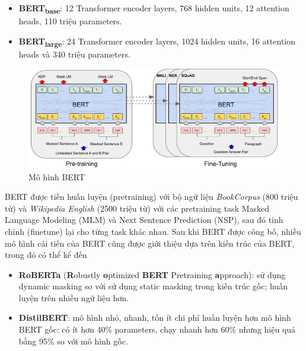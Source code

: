 \begin{itemize}
\item \textbf{BERT\textsubscript{base}}: 12 Transformer encoder layers, 768 hidden units, 12 attention heads, 110 triệu parameters.
\item \textbf{BERT\textsubscript{large}}: 24 Transformer encoder layers, 1024 hidden units, 16 attention heads và 340 triệu parameters.
\end{itemize}
\begin{figure}[H]
\centering
\includegraphics[scale=.65]{img/BERT.jpg}
\caption{Mô hình BERT\cite{devlin-etal-2019-bert}}
\label{fig:my_label}
\end{figure}
BERT được tiền huấn luyện (pretraining) với bộ ngữ liệu \textit{BookCorpus} (800 triệu từ) và \textit{Wikipedia English} (2500 triệu từ) với các pretraining task Masked Language Modeling (MLM) và Next Sentence Prediction (NSP), sau đó tinh chỉnh (finetune) lại cho từng task khác nhau. Sau khi BERT được công bố, nhiều mô hình cải tiến của BERT cũng được giới thiệu dựa trên kiến trúc của BERT, trong đó có thể kể đến
\begin{itemize}
\item \textbf{RoBERTa} (\textbf{R}obustly \textbf{o}ptimized \textbf{BERT} Pretraining \textbf{a}pproach)\cite{DBLP:journals/corr/abs-1907-11692}: sử dụng dynamic masking so với sử dụng static masking trong kiến trúc gốc; huấn luyện trên nhiều ngữ liệu hơn.
\item \textbf{DistilBERT}\cite{DBLP:journals/corr/abs-1910-01108}: mô hình nhỏ, nhanh, tốn ít chi phí huấn luyện hơn mô hình BERT gốc: có ít hơn 40\% parameters, chạy nhanh hơn 60\% nhưng hiệu quả bằng 95\% so với mô hình gốc.
\end{itemize}


